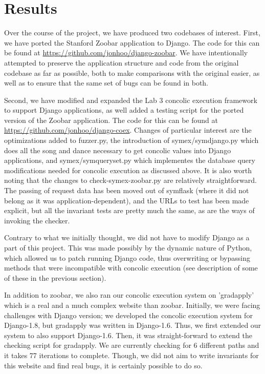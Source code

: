 \documentclass{scrartcl}
\begin{document}
\section{Results}
Over the course of the project, we have produced two codebases of interest.
First, we have ported the Stanford Zoobar application to Django. The code for
this can be found at \url{https://github.com/jonhoo/django-zoobar}. We have
intentionally attempted to preserve the application structure and code from the
original codebase as far as possible, both to make comparisons with the
original easier, as well as to ensure that the same set of bugs can be found in
both.

Second, we have modified and expanded the Lab 3 concolic execution framework to
support Django applications, as well added a testing script for the ported
version of the Zoobar application. The code for this can be found at
\url{https://github.com/jonhoo/django-coex}. Changes of particular interest are
the optimizations added to fuzzer.py, the introduction of symex/symdjango.py
which does all the song and dance necessary to get concolic values into Django
applications, and symex/symqueryset.py which implementes the database query
modifications needed for concolic execution as discussed above. It is also
worth noting that the changes to check-symex-zoobar.py are relatively
straightforward. The passing of request data has been moved out of symflask
(where it did not belong as it was application-dependent), and the URLs to test
has been made explicit, but all the invariant tests are pretty much the same,
as are the ways of invoking the checker.

Contrary to what we initially thought, we did not have to modify Django as a
part of this project. This was made possibly by the dynamic nature of Python,
which allowed us to patch running Django code, thus overwriting or bypassing
methods that were incompatible with concolic execution (see description of some
of these in the previous section).

In addition to zoobar, we also ran our concolic execution system on 'gradapply' which is a real and a much complex website than zoobar. Initially, we were facing challenges with Django version; we developed the concolic execution system for Django-1.8, but gradapply was written in Django-1.6. Thus, we first extended our system to also support Django-1.6. Then, it was straight-forward to extend the checking script for gradapply. We are currently checking for 6 different paths and it takes 77 iterations to complete. Though, we did not aim to write invariants for this website and find real bugs, it is certainly possible to do so.
\end{document}
